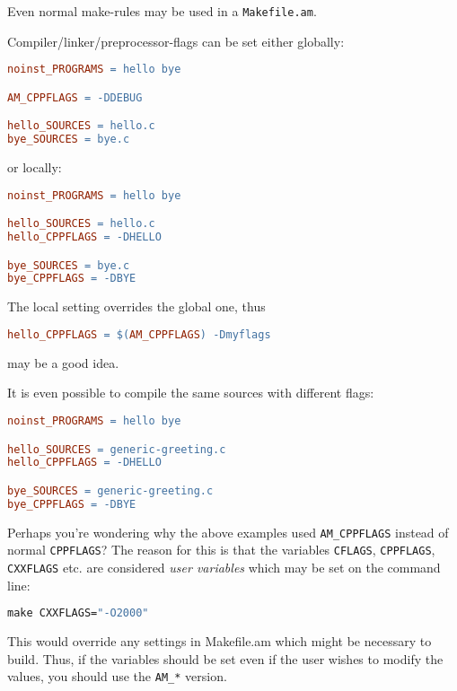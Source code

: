 \documentclass[11pt,a4paper,headinclude,footinclude,DIV16,normalheadings]{scrartcl}
\newcommand{\makefileam}{\texttt{Makefile.am}\xspace}
\begin{document}
Even normal make-rules may be used in a \makefileam.


Compiler/linker/preprocessor-flags can be set either globally:

\begin{lstlisting}[language=make]
noinst_PROGRAMS = hello bye

AM_CPPFLAGS = -DDEBUG

hello_SOURCES = hello.c
bye_SOURCES = bye.c
\end{lstlisting}

or locally:

\begin{lstlisting}[language=make]
noinst_PROGRAMS = hello bye

hello_SOURCES = hello.c
hello_CPPFLAGS = -DHELLO

bye_SOURCES = bye.c
bye_CPPFLAGS = -DBYE
\end{lstlisting}

The local setting overrides the global one, thus

\begin{lstlisting}[language=make]
hello_CPPFLAGS = $(AM_CPPFLAGS) -Dmyflags
\end{lstlisting}

may be a good idea.

It is even possible to compile the same sources with different flags:

\begin{lstlisting}[language=make]
noinst_PROGRAMS = hello bye

hello_SOURCES = generic-greeting.c
hello_CPPFLAGS = -DHELLO

bye_SOURCES = generic-greeting.c
bye_CPPFLAGS = -DBYE
\end{lstlisting}

Perhaps you're wondering why the above examples used
\texttt{AM\_CPPFLAGS} instead of normal \texttt{CPPFLAGS}? The
reason for this is that the variables \texttt{CFLAGS},
\texttt{CPPFLAGS}, \texttt{CXXFLAGS} etc. are considered {\em user
  variables} which may be set on the command line:

\begin{lstlisting}[language=make]
make CXXFLAGS="-O2000"
\end{lstlisting}

This would override any settings in Makefile.am which might be
necessary to build. Thus, if the variables should be set even if the
user wishes to modify the values, you should use the \texttt{AM\_*}
version. 
\end{document}
